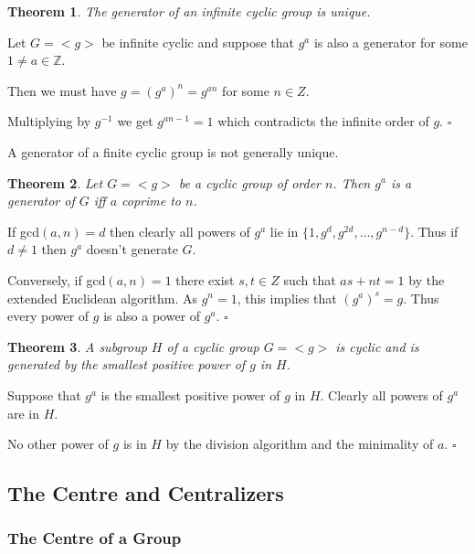 \documentclass[10pt]{article}
\newcommand{\Z}{\mathbb{Z}}
\newtheorem{theorem}{Theorem}[section]
\newenvironment{proof}[1][Proof]{\begin{trivlist}
\item[\hskip \labelsep {\itshape #1}]}{\end{trivlist}}
\begin{document}
\begin{theorem}
The generator of an infinite cyclic group is unique.
\end{theorem}

\begin{proof}
Let $G = <g>$ be infinite cyclic and suppose that $g^a$ is also a generator for some $1 \neq a \in \Z$.

Then we must have $g = (g^a)^n = g^{an}$ for some $n \in Z$.

Multiplying by $g^{-1}$ we get $g^{an - 1} = 1$ which contradicts the infinite order of $g$. $\square$
\end{proof}

A generator of a finite cyclic group is not generally unique.

\begin{theorem}
Let $G = <g>$ be a cyclic group of order $n$. Then $g^a$ is a generator of $G$ iff $a$ coprime to $n$.
\end{theorem}

\begin{proof}
If gcd$(a, n) = d$ then clearly all powers of $g^a$ lie in $\{1, g^d, g^{2d}, \ldots, g^{n - d}\}$. Thus if $d \neq 1$ then $g^a$ doesn't generate $G$.

Conversely, if gcd$(a, n) = 1$ there exist $s, t \in Z$ such that $as + nt = 1$ by the extended Euclidean algorithm. As $g^n = 1$, this implies that $(g^a)^s = g$. Thus every power of $g$ is also a power of $g^a$. $\square$
\end{proof}

\begin{theorem}
A subgroup $H$ of a cyclic group $G = <g>$ is cyclic and is generated by the smallest positive power of $g$ in $H$.
\end{theorem}

\begin{proof}
Suppose that $g^a$ is the smallest positive power of $g$ in $H$. Clearly all powers of $g^a$ are in $H$.

No other power of $g$ is in $H$ by the division algorithm and the minimality of $a$. $\square$
\end{proof}

\subsection{The Centre and Centralizers}

\subsubsection{The Centre of a Group}
\end{document}
